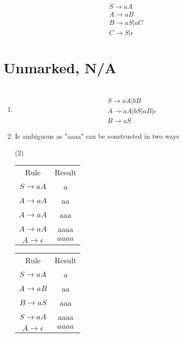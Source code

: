 \documentclass{article} %
\begin{document}
    \section{}
            \begin{gather*}
                S \to aA\\
                A \to aB\\
                B \to aS | aC\\
                C \to S | \epsilon
            \end{gather*}
    \section{Unmarked, N/A}
    \section{}
        \begin{enumerate}

            \item
            \begin{gather*}
                S \to aA | bB\\
                A \to aA | bS | aB | \epsilon\\
                B \to aS
            \end{gather*}
            \item Is ambiguous as "aaaa" can be constructed in two ways
            \begin{center}
                \begin{varwidth}{\textwidth}
                \begin{tasks}[label={(\Roman*)},label-width={1cm}](2)
                    \task
                    \begin{tabular}{ c c}
                        Rule & Result\\
                        $S \to aA$ & a\\
                        $A \to aA$ & aa\\
                        $A \to aA$ & aaa\\
                        $A \to aA$ & aaaa\\
                        $A \to \epsilon$ & $\underline{aaaa}$
                    \end{tabular}

                    \task
                    \begin{tabular}{ c c}
                        Rule & Result\\
                        $S \to aA$ & a\\
                        $A \to aB$ & aa\\
                        $B \to aS$ & aaa\\
                        $S \to aA$ & aaaa\\
                        $A \to \epsilon$ & $\underline{aaaa}$
                    \end{tabular}
                \end{tasks}
                \end{varwidth}
            \end{center}
        \end{enumerate}
\end{document}
